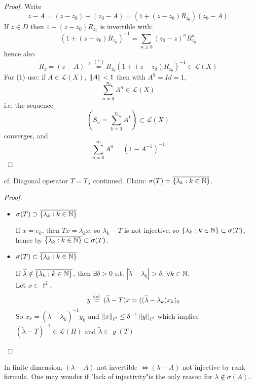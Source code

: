 \documentclass{article}
\begin{document}
\begin{proof}
Write 
\[
z-A=
( z-z_0)+(z_0-A)=(1+(z-z_0)R_{z_0})(z_0-A) \tag{$*$}
\]
If $z\in D$ then $1+(z-z_0)R_{z_0}$ is invertible with:
\[
(1+(z-z_0)R_{z_0})^{-1}=\sum_{n\geq0}(z_0-z)^n R_{z_0}^n \tag{1}
\]
hence also
$$
R_z=(z-A)^{-1}\stackrel{(*)}{=}R_{z_0}(1+(z-z_0)R_{z_0})^{-1}\in\mathcal{L}(X)
$$
For (1) use: if $A\in\mathcal{L}(X)$, $\left\|{A}\right\|<1$ then with $A^0=Id=1$, 
$$
\sum_{n=0}^\infty A^n\in\mathcal{L}(X)
$$
i.e. the sequence
$$
\left(
S_n=\sum_{k=0}^n A^k
\right)\subset\mathcal{L}(X)
$$
converges, and
$$
\sum_{n=0}^\infty A^n=(1-A^{-1})^{-1}
$$
\end{proof}


\begin{example}\nl
cf. 
    Diagonal operator $T=T_\lambda$ continued. Claim: $\sigma(T)=\overline{\{\lambda_k:k\in\mathbb{N}\}}$.
\end{example}
\begin{proof}
\begin{itemize}
    \item $\sigma(T)\supset\overline{\{\lambda_k:k\in\mathbb{N}\}}$  

    If $x=e_k$, then $Tx=\lambda_k x$, so $\lambda_k-T$ is not injective, so $\{\lambda_k:k\in\mathbb{N}\}\subset\sigma(T)$, hence by  $\overline{\{\lambda_k:k\in\mathbb{N}\}} \subset \sigma(T)$.
    
      

    \item $\sigma(T)\subset\overline{\{\lambda_k:k\in\mathbb{N}\}}$  
    
    If $\widetilde{\lambda}\notin\overline{\{\lambda_k:k\in\mathbb{N}\}}$, then $\exists\delta>0$ s.t. $|\widetilde{\lambda}-\lambda_k|>\delta$, $\forall k\in\mathbb{N}$. \\
    Let $x\in\ell^2$, 
    $$
    y\stackrel{\text{def.}}{=}(\widetilde{\lambda}-T)x=((\widetilde{\lambda}-\lambda_k)x_k)_k
    $$
    So $x_k=(\widetilde{\lambda}-\lambda_k)^{-1}y_k$ and $\left\|{x}\right\|_{\ell^2}\leq\delta^{-1}\left\|{y}\right\|_{\ell^2}$ which implies $(\widetilde{\lambda}-T)^{-1}\in\mathcal{L}(H)$ and $\widetilde{\lambda}\in\varrho(T)$
\end{itemize}
\end{proof}

\begin{remark}\nl
    In finite dimension, $(\lambda-A)$ not invertible $\iff(\lambda-A)$ not injective by rank formula. One may wonder if "lack of injectivity"is the only reason for $\lambda\notin \sigma(A)$.
\end{remark}
\end{document}
